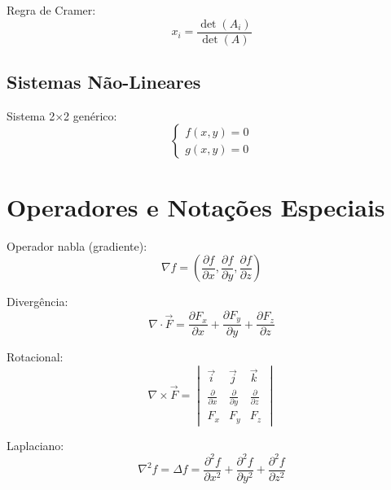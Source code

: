Regra de Cramer:
\begin{equation}
x_i = \frac{\det(A_i)}{\det(A)}
\end{equation}

\subsection{Sistemas Não-Lineares}

Sistema 2×2 genérico:
\begin{equation}
\begin{cases}
f(x,y) = 0 \\
g(x,y) = 0
\end{cases}
\end{equation}


\section{Operadores e Notações Especiais}

Operador nabla (gradiente):
\begin{equation}
\nabla f = \left(\frac{\partial f}{\partial x}, \frac{\partial f}{\partial y}, \frac{\partial f}{\partial z}\right)
\end{equation}

Divergência:
\begin{equation}
\nabla \cdot \vec{F} = \frac{\partial F_x}{\partial x} + \frac{\partial F_y}{\partial y} + \frac{\partial F_z}{\partial z}
\end{equation}

Rotacional:
\begin{equation}
\nabla \times \vec{F} = \begin{vmatrix}
\vec{i} & \vec{j} & \vec{k} \\
\frac{\partial}{\partial x} & \frac{\partial}{\partial y} & \frac{\partial}{\partial z} \\
F_x & F_y & F_z
\end{vmatrix}
\end{equation}

Laplaciano:
\begin{equation}
\nabla^2 f = \Delta f = \frac{\partial^2 f}{\partial x^2} + \frac{\partial^2 f}{\partial y^2} + \frac{\partial^2 f}{\partial z^2}
\end{equation}

